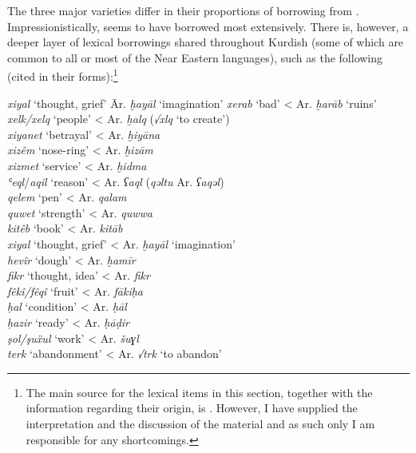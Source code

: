 \documentclass[output=paper]{langsci/langscibook}
\begin{document}
The three major varieties differ in their proportions of borrowing from . Impressionistically,  seems to have borrowed most extensively. There is, however, a deeper layer of lexical borrowings shared throughout Kurdish (some of which are common to all or most of the Near Eastern languages), such as the following (cited in their  forms):\footnote{The main source for the lexical items in this section, together with the information regarding their  origin, is \citet{Chyet2003}. However, I have supplied the interpretation and the discussion of the material and as such only I am responsible for any shortcomings.} 

\ea
\begin{tabbing}
\textit{xiyal} ‘thought, grief’ \hspace{1em} \= Ar. \textit{ḫayāl} ‘imagination’\kill
\textit{xerab} ‘bad’     \> < Ar. \textit{ḫarāb} ‘ruins’\\
\textit{xelk/xelq} ‘people’  \> < Ar. \textit{ḫalq} (\textit{√xlq} ‘to create’)\\
\textit{xiyanet} ‘betrayal’  \> < Ar. \textit{ḫiyāna} \\
\textit{xizêm} ‘nose-ring’  \> < Ar. \textit{ḫizām}\\
\textit{xizmet} ‘service’  \> < Ar. \textit{ḫidma} \\
\textit{ʿeql}/\textit{aqil} ‘reason’  \> < Ar. \textit{ʕaql} (\textit{qəltu} Ar. \textit{ʕaqəl})\\
\textit{qelem} ‘pen’    \> < Ar. \textit{qalam}\\
\textit{quwet} ‘strength’  \> < Ar. \textit{quwwa}\\
\textit{kitêb} ‘book’    \> < Ar. \textit{kitāb}\\
\textit{xiyal} ‘thought, grief’  \> < Ar. \textit{ḫayāl} ‘imagination’\\
\textit{hevîr} ‘dough’    \> < Ar. \textit{ḫamīr} \\
\textit{fikr} ‘thought, idea’  \> < Ar. \textit{fikr}\\
\textit{fêkî/fêqî} ‘fruit’  \> < Ar. \textit{fākiḥa}\\
\textit{ḥal} ‘condition’  \> < Ar. \textit{ḥāl} \\
\textit{ḥazir} ‘ready’    \> < Ar. \textit{ḥāḍir}\\
\textit{şol/şuẍul} ‘work’  \> < Ar. \textit{šuɣl} \\
\textit{terk} ‘abandonment’  \> < Ar. \textit{√trk} ‘to abandon’
\end{tabbing}
\z
\end{document}
